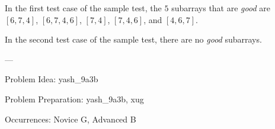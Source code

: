 In the first test case of the sample test, the $5$ subarrays that are \textit{good} are $[6, 7, 4]$, $[6, 7, 4, 6]$, $[7, 4]$, $[7, 4, 6]$, and $[4, 6, 7]$.

In the second test case of the sample test, there are no \textit{good} subarrays.

---

Problem Idea: yash_9a3b

Problem Preparation: yash_9a3b, xug

Occurrences: Novice G, Advanced B
